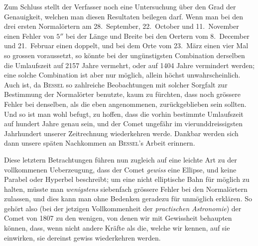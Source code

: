 Zum Schluss stellt der Verfasser noch eine Untersuchung über den Grad der Genauigkeit, welchen man diesen Resultaten beilegen darf. Wenn man bei den drei ersten Normalörtern am 28.\ September, 22.\ October und 11.\ November einen Fehler von $5''$ bei der Länge und Breite bei den Oertern vom 8.\ December und 21.\ Februar einen doppelt, und bei dem Orte vom 23.\ März einen vier Mal so grossen voraussetzt, so könnte bei der ungünstigsten Combination derselben die Umlaufszeit auf 2157 Jahre vermehrt, oder auf 1404 Jahre vermindert werden; eine solche Combination ist aber nur möglich, allein höchst unwahrscheinlich. Auch ist, da \textsc{Bessel} so zahlreiche Beobachtungen mit solcher Sorgfalt zur Bestimmung der Normalörter benutzte, kaum zu fürchten, dass noch grössere Fehler bei denselben, als die eben angenommenen, zurückgeblieben sein sollten. Und so ist man wohl befugt, zu hoffen, dass die vorhin bestimmte Umlaufszeit auf hundert Jahre genau sein, und der Comet ungefähr im vierunddreissigsten Jahrhundert unserer Zeitrechnung wiederkehren werde. Dankbar werden sich dann unsere späten Nachkommen an \textsc{Bessel}'s Arbeit erinnern.

Diese letztern Betrachtungen führen nun zugleich auf eine leichte Art zu der vollkommenen Ueberzeugung, dass der Comet \emph{gewiss} eine Ellipse, und keine Parabel oder Hyperbel beschreibt; um eine nicht elliptische Bahn für möglich zu halten, müsste man \emph{wenigstens} siebenfach grössere Fehler bei den Normalörtern zulassen, und dies kann man ohne Bedenken geradezu für unmöglich erklären. So gehört also (bei der jetzigen Vollkommenheit der \emph{practischen Astronomie}) der Comet von 1807 zu den wenigen, von denen wir mit Gewissheit behaupten können, dass, wenn nicht andere Kräfte als die, welche wir kennen, auf sie einwirken, sie dereinst gewiss wiederkehren werden.
